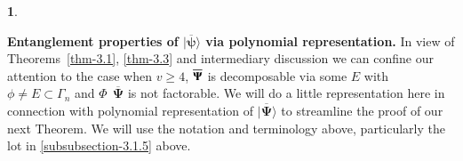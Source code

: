 \documentclass[a4paper,12pt]{article}
\theoremstyle{definition}
\theoremstyle{underlinethm}
\theoremstyle{definition}
\newtheorem{subsubsec}{}[subsection]
\begin{document}
\begin{subsubsec}\label{subsubsection-3.1.6}

\textbf{Entanglement properties of $\mathbf{| \overline{\boldsymbol{\psi}} \rangle}$ via polynomial representation.} In view of Theorems~\eqref{thm-3.1}, \eqref{thm-3.3} and intermediary discussion we can confine our attention to the case when $v \geq 4$, $\overline{\bold{\Psi}}$ is decomposable via some  $E$ with $\phi \neq E \subset \Gamma_{n}$ and $\Phi~~ \overline{\boldsymbol{\Psi}}$ is not factorable. We will do a little representation here in connection with polynomial representation of $| \overline{\boldsymbol{\Psi}} \rangle$ to streamline the proof of our next Theorem. We will use the notation and terminology above, particularly the lot in \eqref{subsubsection-3.1.5} above.
\end{subsubsec}
\end{document}
